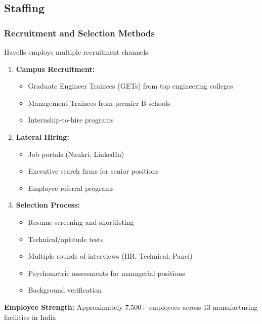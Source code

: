 \documentclass[12pt,a4paper]{article}
\begin{document}
\subsection{Staffing}

\subsubsection{Recruitment and Selection Methods}

Havells employs multiple recruitment channels:

\begin{enumerate}[leftmargin=*]
    \item \textbf{Campus Recruitment:}
    \begin{itemize}
        \item Graduate Engineer Trainees (GETs) from top engineering colleges
        \item Management Trainees from premier B-schools
        \item Internship-to-hire programs
    \end{itemize}
    
    \item \textbf{Lateral Hiring:}
    \begin{itemize}
        \item Job portals (Naukri, LinkedIn)
        \item Executive search firms for senior positions
        \item Employee referral programs
    \end{itemize}
    
    \item \textbf{Selection Process:}
    \begin{itemize}
        \item Resume screening and shortlisting
        \item Technical/aptitude tests
        \item Multiple rounds of interviews (HR, Technical, Panel)
        \item Psychometric assessments for managerial positions
        \item Background verification
    \end{itemize}
\end{enumerate}

\textbf{Employee Strength:} Approximately 7,500+ employees across 13 manufacturing facilities in India
\end{document}
